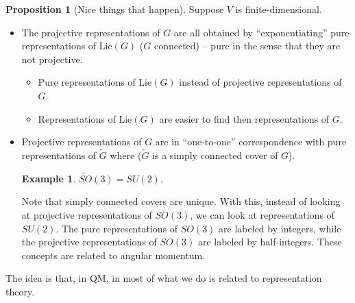 \documentclass{book}
\theoremstyle{definition}
\newtheorem{prop}{Proposition}[section]
\newtheorem{exmp}{Example}[section]
\begin{document}
\begin{prop}[Nice things that happen] Suppose $V$ is finite-dimensional. 
	\begin{itemize}
		\item The projective representations of $G$  are all obtained by ``exponentiating'' pure representations of Lie$(G)$ ($G$ connected) -- pure in the sense that they are not projective. 
		\begin{itemize}
			\item Pure representations of Lie$(G)$ instead of projective representations of $G$. 
			\item Representations of Lie$(G)$ are easier to find then representations of $G$. 
		\end{itemize}  
	
	
		\item Projective representations of $G$ are in ``one-to-one'' correspondence with pure representations of $\tilde{G}$ where ($\tilde{G}$ is a simply connected cover of $G$). 
		\begin{exmp}
			$\tilde{SO}(3) = SU(2)$. 
		\end{exmp}
		Note that simply connected covers are unique. With this, instead of looking at projective representations of $SO(3)$, we can look at representations of $SU(2)$. The pure representations of $SO(3)$ are labeled by integers, while the projective representations of $SO(3)$ are labeled by half-integers. These concepts are related to angular momentum. 
	\end{itemize}
	
\end{prop}


The idea is that, in QM, in most of what we do is related to representation theory. 



























\newpage
\end{document}
